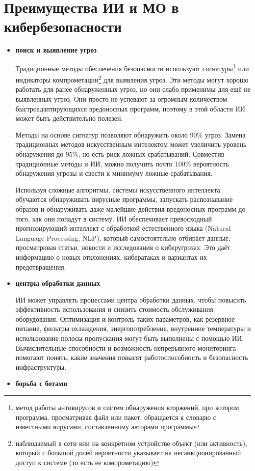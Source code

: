 \documentclass{article}
\begin{document}
	\section*{Преимущества ИИ и МО в кибербезопасности}
	\begin{itemize}
		\item \textbf{поиск и выявление угроз}
		
		Традиционные методы обеспечения безопасности используют сигнатуры\footnote{метод работы антивирусов и систем обнаружения вторжений, при котором программа, просматривая файл или пакет, обращается к словарю с известными вирусами, составленному авторами программы} или индикаторы компрометации\footnote{наблюдаемый в сети или на конкретном устройстве объект (или активность), который с большой долей вероятности указывает на несанкционированный доступ к системе (то есть ее компрометацию)} для выявления угроз. Эти методы могут хорошо работать для ранее обнаруженных угроз, но они слабо применимы для ещё не выявленных угроз. Они просто не успевают за огромным количеством быстроадаптирующихся вредоносных программ, поэтому в этой области ИИ может быть действительно полезен. 

  
		Методы на основе сигнатур позволяют обнаружить около 90\% угроз. Замена традиционных методов искусственным интелектом может увеличить уровень обнаружения до 95\%, но есть риск ложных срабатываний. Совместив традиционные методы и ИИ, можно получить почти 100\% вероятность обнаружения угрозы и свести к минимуму ложные срабатывания.
  \par
		Используя сложные алгоритмы, системы искусственного интеллекта обучаются обнаруживать вирусные программы, запускать распознавание образов и обнаруживать даже малейшие действия вредоносных программ до того, как они попадут в систему. ИИ обеспечивает превосходный прогнозирующий интеллект с обработкой естественного языка (Natural Language Processing, NLP), который самостоятельно отбирает данные, просматривая статьи, новости и исследования о киберугрозах. Это даёт информацию о новых отклонениях, кибератаках и вариантах их предотвращения.
		\item \textbf{центры обработки данных}
		
		ИИ может управлять процессами центра обработки данных, чтобы повысить эффективность использования и снизить стоимость обслуживания оборудования. Оптимизация и контроль таких параметров, как резервное питание, фильтры охлаждения, энергопотребление, внутренние температуры и использование полосы пропускания могут быть выполнены с помощью ИИ. Вычислительные способности и возможность непрерывного мониторинга помогают понять, какие значения повысят работоспособность и безопасность инфраструктуры.
		\item \textbf{борьба с ботами}
		

\end{itemize}
\end{document}
